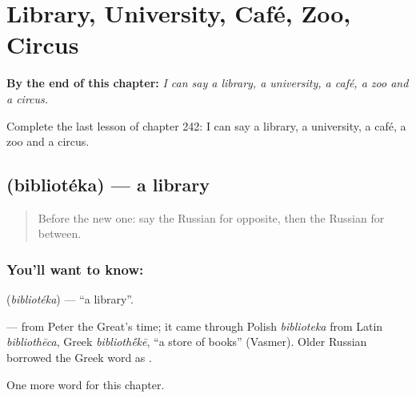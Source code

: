 
\chapter{Library, University, Café, Zoo, Circus}
\label{ch:ru-library-university-cafe-zoo-circus}

\begin{chapteropening}
\textbf{By the end of this chapter:} \emph{I can say a library, a university, a café, a zoo and a circus.}

Complete the last lesson of chapter 242: I can say a library, a university, a café, a zoo and a circus.
\end{chapteropening}

\section[\texorpdfstring{\ru{библиотека} (bibliotéka)}{библиотека (bibliotéka)}]{ (bibliotéka) — a library}

\label{lesson:RU-C242-biblioteka}



\begin{quote}
Before the new one: say the Russian for opposite, then the Russian for between.
\end{quote}

\subsection*{You'll want to know: }
\textbf{} (\emph{bibliotéka}) — \textquotedblleft{}a library\textquotedblright{}.

\begin{cousinweb}
\textbf{} — from Peter the Great's time; it came through Polish \emph{biblioteka} from Latin \emph{bibliothēca}, Greek \emph{biblioth\'{\={e}}kē}, \textquotedblleft{}a store of books\textquotedblright{} (Vasmer). Older Russian borrowed the Greek word as \emph{}.
\end{cousinweb}

\begin{grammarlens}[title={What you've built}]
One more word for this chapter.
\end{grammarlens}

